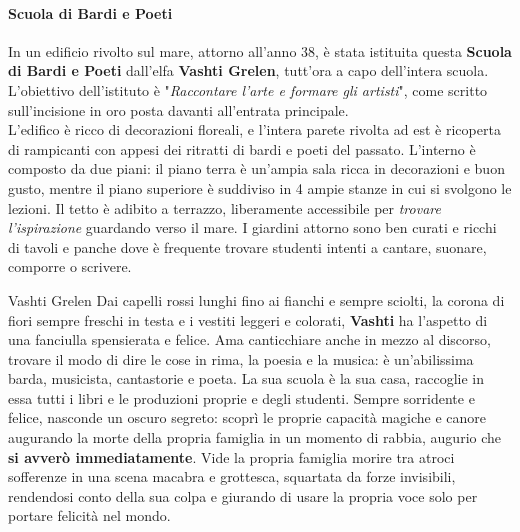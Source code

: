 \documentclass[10pt,twoside,onecolumn,openany]{book}
\begin{document}
\begin{multicols}{2}
\paragraph{Scuola di Bardi e Poeti}
In un edificio rivolto sul mare, attorno all'anno 38, è stata istituita questa \textbf{Scuola di Bardi e Poeti} dall'elfa \textbf{Vashti Grelen}, tutt'ora a capo dell'intera scuola.\\
L'obiettivo dell'istituto è "\textit{Raccontare l'arte e formare gli artisti}", come scritto sull'incisione in oro posta davanti all'entrata principale.\\
L'edifico è ricco di decorazioni floreali, e l'intera parete rivolta ad est è ricoperta di rampicanti con appesi dei ritratti di bardi e poeti del passato. L'interno è composto da due piani: il piano terra è un'ampia sala ricca in decorazioni e buon gusto, mentre il piano superiore è suddiviso in 4 ampie stanze in cui si svolgono le lezioni. Il tetto è adibito a terrazzo, liberamente accessibile per \textit{trovare l'ispirazione} guardando verso il mare. I giardini attorno sono ben curati e ricchi di tavoli e panche dove è frequente trovare studenti intenti a cantare, suonare, comporre o scrivere.
\columnbreak
\begin{paperbox}{{Vashti Grelen}}
Dai capelli rossi lunghi fino ai fianchi e sempre sciolti, la corona di fiori sempre freschi in testa e i vestiti leggeri e colorati, \textbf{Vashti} ha l'aspetto di una fanciulla spensierata e felice. Ama canticchiare anche in mezzo al discorso, trovare il modo di dire le cose in rima, la poesia e la musica: è un'abilissima barda, musicista, cantastorie e poeta. La sua scuola è la sua casa, raccoglie in essa tutti i libri e le produzioni proprie e degli studenti. Sempre sorridente e felice, nasconde un oscuro segreto: scoprì le proprie capacità magiche e canore augurando la morte della propria famiglia in un momento di rabbia, augurio che \textbf{si avverò immediatamente}. Vide la propria famiglia morire tra atroci sofferenze in una scena macabra e grottesca, squartata da forze invisibili, rendendosi conto della sua colpa e giurando di usare la propria voce solo per portare felicità nel mondo.
\end{paperbox}
\end{multicols}
\end{document}
